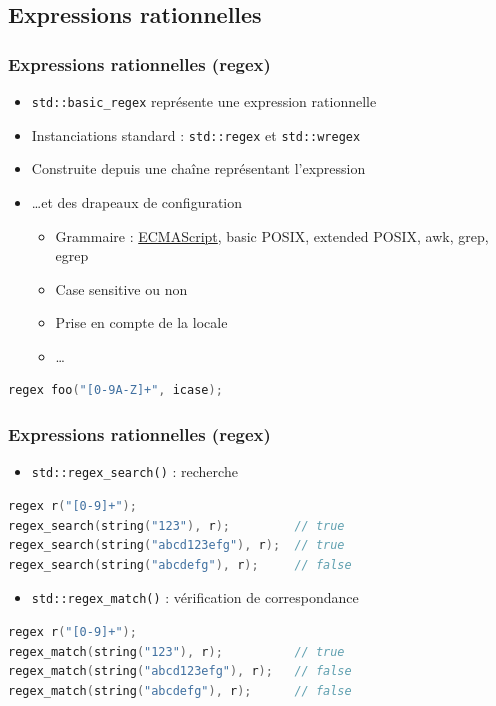 \documentclass[C++.tex]{subfiles}
\begin{document}
\subsection*{Expressions rationnelles}
\begin{frame}[fragile]
	\frametitle{Expressions rationnelles (regex)}
	\begin{itemize}
		\item \lstinline|std::basic_regex| représente une expression rationnelle
		\item Instanciations standard : \lstinline|std::regex| et \lstinline|std::wregex|
		\item Construite depuis une chaîne représentant l'expression
		\item \ldots et des drapeaux de configuration
		\begin{itemize}
			\item Grammaire : \underline{ECMAScript}, basic POSIX, extended POSIX, awk, grep, egrep
			\item Case sensitive ou non
			\item Prise en compte de la locale
			\item \ldots
		\end{itemize}
	\end{itemize}

	\begin{lstlisting}[language=C++]
regex foo("[0-9A-Z]+", icase);\end{lstlisting}
\end{frame}

\begin{frame}[fragile]
	\frametitle{Expressions rationnelles (regex)}
	\begin{itemize}
		\item\lstinline|std::regex_search()| : recherche
	\end{itemize}

	\begin{lstlisting}[language=C++]
regex r("[0-9]+");
regex_search(string("123"), r);         // true
regex_search(string("abcd123efg"), r);  // true
regex_search(string("abcdefg"), r);     // false\end{lstlisting}

	\begin{itemize}
		\item \lstinline|std::regex_match()| : vérification de correspondance
	\end{itemize}

	\begin{lstlisting}[language=C++]
regex r("[0-9]+");
regex_match(string("123"), r);          // true
regex_match(string("abcd123efg"), r);   // false
regex_match(string("abcdefg"), r);      // false\end{lstlisting}
\end{frame}
\end{document}
